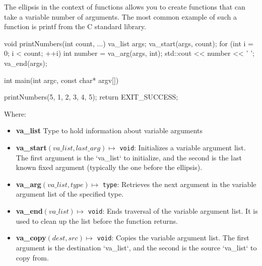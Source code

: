 \documentclass{report}
\begin{document}
    \pagebreak
    \bigbreak \noindent 
    \begin{concept}
        The ellipsis in the context of functions allows you to create functions that can take a variable number of arguments. The most common example of such a function is printf from the C standard library. 
        \bigbreak \noindent 
        \begin{cppcode}
void printNumbers(int count, ...) {
    va_list args;
    va_start(args, count);
    for (int i = 0; i < count; ++i) {
        int number = va_arg(args, int);
        std::cout << number << ' ';
    }
    va_end(args);
}

int main(int argc, const char* argv[]) {

    printNumbers(5, 1, 2, 3, 4, 5);
    return EXIT_SUCCESS;
}
        \end{cppcode}
    \end{concept}
    \bigbreak \noindent 
    Where:
    \begin{itemize}
        \item \textbf{va\_list} Type to hold information about variable arguments 
        \item \textbf{va\_start}\((va\_list, last\_arg) \mapsto\) \texttt{void}: Initializes a variable argument list. The first argument is the `va\_list` to initialize, and the second is the last known fixed argument (typically the one before the ellipsis).
        \item \textbf{va\_arg}\((va\_list, type) \mapsto\) \texttt{type}: Retrieves the next argument in the variable argument list of the specified type.
        \item \textbf{va\_end}\((va\_list) \mapsto\) \texttt{void}: Ends traversal of the variable argument list. It is used to clean up the list before the function returns.
        \item \textbf{va\_copy}\((dest, src) \mapsto\) \texttt{void}: Copies the variable argument list. The first argument is the destination `va\_list`, and the second is the source `va\_list` to copy from.
    \end{itemize}
\end{document}
